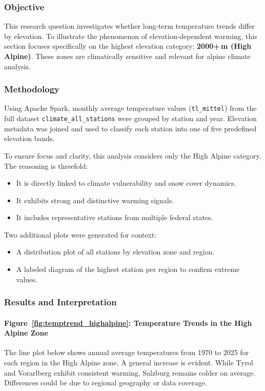 
\subsubsection{Objective}
This research question investigates whether long-term temperature trends differ by elevation. To illustrate the phenomenon of elevation-dependent warming, this section focuses specifically on the highest elevation category: \textbf{2000+\,m (High Alpine)}. These zones are climatically sensitive and relevant for alpine climate analysis.

\subsubsection{Methodology}
Using Apache Spark, monthly average temperature values (\texttt{tl\_mittel}) from the full dataset \texttt{climate\_all\_stations} were grouped by station and year. Elevation metadata was joined and used to classify each station into one of five predefined elevation bands.

To ensure focus and clarity, this analysis considers only the High Alpine category. The reasoning is threefold:
\begin{itemize}
    \item It is directly linked to climate vulnerability and snow cover dynamics.
    \item It exhibits strong and distinctive warming signals.
    \item It includes representative stations from multiple federal states.
\end{itemize}

Two additional plots were generated for context:
\begin{itemize}
    \item A distribution plot of all stations by elevation zone and region.
    \item A labeled diagram of the highest station per region to confirm extreme values.
\end{itemize}

\subsubsection{Results and Interpretation}

\paragraph{Figure~\ref{fig:temptrend_highalpine}: Temperature Trends in the High Alpine Zone}
The line plot below shows annual average temperatures from 1970 to 2025 for each region in the High Alpine zone. A general increase is evident. While Tyrol and Vorarlberg exhibit consistent warming, Salzburg remains colder on average. Differences could be due to regional geography or data coverage.

